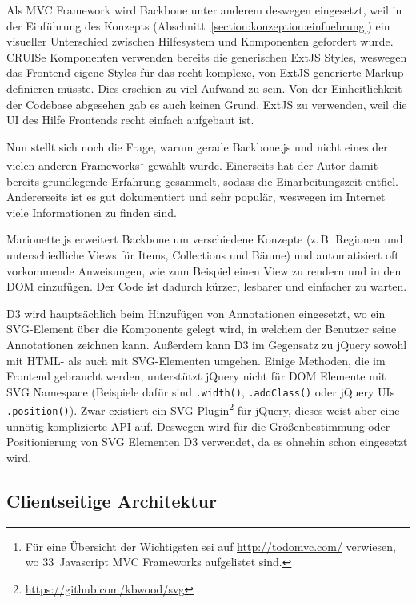 \documentclass[
	headsepline,
	footsepline,
	fontsize=12pt,
	bibliography=totoc
]{scrbook}
\begin{document}
Als MVC Framework wird Backbone unter anderem deswegen eingesetzt, weil in der Einführung des Konzepts (Abschnitt~\ref{section:konzeption:einfuehrung}) ein visueller Unterschied zwischen Hilfesystem und Komponenten gefordert wurde. CRUISe Komponenten verwenden bereits die generischen ExtJS Styles, weswegen das Frontend eigene Styles für das recht komplexe, von ExtJS generierte Markup definieren müsste. Dies erschien zu viel Aufwand zu sein. Von der Einheitlichkeit der Codebase abgesehen gab es auch keinen Grund, ExtJS zu verwenden, weil die UI des Hilfe Frontends recht einfach aufgebaut ist.

Nun stellt sich noch die Frage, warum gerade Backbone.js und nicht eines der vielen anderen Frameworks\footnote{Für eine Übersicht der Wichtigsten sei auf \url{http://todomvc.com/} verwiesen, wo 33~Javascript MVC Frameworks aufgelistet sind.} gewählt wurde. Einerseits hat der Autor damit bereits grundlegende Erfahrung gesammelt, sodass die Einarbeitungszeit entfiel. Andererseits ist es gut dokumentiert und sehr populär, weswegen im Internet viele Informationen zu finden sind.

Marionette.js erweitert Backbone um verschiedene Konzepte (z.\,B. Regionen und unterschiedliche Views für Items, Collections und Bäume) und automatisiert oft vorkommende Anweisungen, wie zum Beispiel einen View zu rendern und in den DOM einzufügen. Der Code ist dadurch kürzer, lesbarer und einfacher zu warten.

D3 wird hauptsächlich beim Hinzufügen von Annotationen eingesetzt, wo ein SVG-Element über die Komponente gelegt wird, in welchem der Benutzer seine Annotationen zeichnen kann. Außerdem kann D3 im Gegensatz zu jQuery sowohl mit HTML- als auch mit SVG-Elementen umgehen. Einige Methoden, die im Frontend gebraucht werden, unterstützt jQuery nicht für DOM Elemente mit SVG Namespace (Beispiele dafür sind \texttt{.width()}, \texttt{.addClass()} oder jQuery UIs \texttt{.position()}). Zwar existiert ein SVG Plugin\footnote{\url{https://github.com/kbwood/svg}} für jQuery, dieses weist aber eine unnötig komplizierte API auf. Deswegen wird für die Größenbestimmung oder Positionierung von SVG Elementen D3 verwendet, da es ohnehin schon eingesetzt wird.

\subsection{Clientseitige Architektur}
\label{section:implementierung:frontend:architektur}
\end{document}
